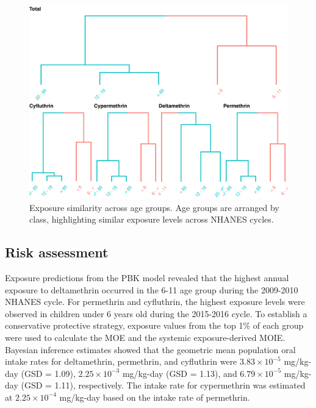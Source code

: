\documentclass[toxics,article,submit,pdftex,moreauthors]{Definitions/mdpi}
\begin{document}
\begin{figure}[H]
\centering
\begin{adjustwidth}{-2cm}{}
\centering
\includegraphics[width=\linewidth]{figures/fig7_cluster}
\hfill
\end{adjustwidth}
\caption{Exposure similarity across age groups. Age groups are arranged by
class, highlighting similar exposure levels across NHANES cycles.\label{fig:fig7}}
\end{figure}

\subsection{Risk assessment}\label{risk-assessment}

Exposure predictions from the PBK model revealed that the highest annual
exposure to deltamethrin occurred in the 6-11 age group during the 2009-2010
NHANES cycle. For permethrin and cyfluthrin, the highest exposure levels were
observed in children under 6 years old during the 2015-2016 cycle. To establish
a conservative protective strategy, exposure values from the top 1\% of each
group were used to calculate the MOE and the systemic exposure-derived MOIE.
Bayesian inference estimates showed that the geometric mean population oral
intake rates for deltamethrin, permethrin, and cyfluthrin were \(3.83 \times
10^{-5}\) mg/kg-day (GSD = 1.09), \(2.25 \times 10^{-3}\) mg/kg-day (GSD =
1.13), and \(6.79 \times 10^{-5}\) mg/kg-day (GSD = 1.11), respectively. The
intake rate for cypermethrin was estimated at \(2.25 \times 10^{-4}\) mg/kg-day
based on the intake rate of permethrin.
\end{document}
